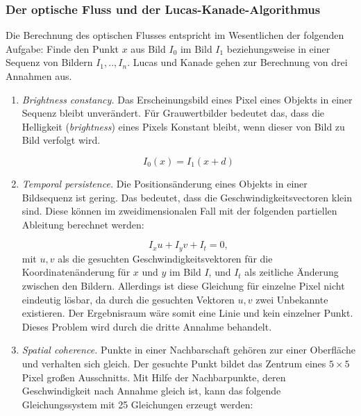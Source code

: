 	\subsubsection{Der optische Fluss und der Lucas-Kanade-Algorithmus}
	Die Berechnung des optischen Flusses entspricht im Wesentlichen der folgenden Aufgabe: Finde den Punkt $x$ aus Bild $I_{0}$ im Bild $I_{1}$ beziehungsweise in einer Sequenz von Bildern $I_{1},..,I_{n}$. Lucas und Kanade gehen zur Berechnung von drei Annahmen aus.

	\begin{enumerate}
	\item \textit{Brightness constancy.} Das Erscheinungsbild eines Pixel eines Objekts in einer Sequenz bleibt unverändert. Für Grauwertbilder bedeutet das, dass die Helligkeit (\textit{brightness}) eines Pixels Konstant bleibt, wenn dieser von Bild zu Bild verfolgt wird.

	\begin{equation}
	I_{0}(x)=I_{1}(x+d)
	\end{equation}

	\item \textit{Temporal persistence. }Die Positionsänderung eines Objekts in einer Bildsequenz ist gering. Das bedeutet, dass die Geschwindigkeitsvectoren klein sind. Diese können im zweidimensionalen Fall mit der folgenden partiellen Ableitung berechnet werden:

	\begin{equation} I_{x}u+I_{y}v+I_{t}=0, \end{equation}
	mit $u,v$ als die gesuchten Geschwindigkeitsvektoren für die Koordinatenänderung für $x$ und $y$ im Bild $I$, und $I_{t}$ als zeitliche Änderung zwischen den Bildern. Allerdings ist diese Gleichung für einzelne Pixel nicht eindeutig lösbar, da durch die gesuchten Vektoren $u,v$ zwei Unbekannte existieren. Der Ergebnisraum wäre somit eine Linie und kein einzelner Punkt. Dieses Problem wird durch die dritte Annahme behandelt.

	\item \textit{Spatial coherence.} Punkte in einer Nachbarschaft gehören zur einer Oberfläche und verhalten sich gleich. Der gesuchte Punkt bildet das Zentrum eines $5\times5$ Pixel großen Ausschnitts.
	Mit Hilfe der Nachbarpunkte, deren Geschwindigkeit nach Annahme gleich ist, kann das folgende Gleichungssystem mit 25 Gleichungen erzeugt werden:


\end{enumerate}
